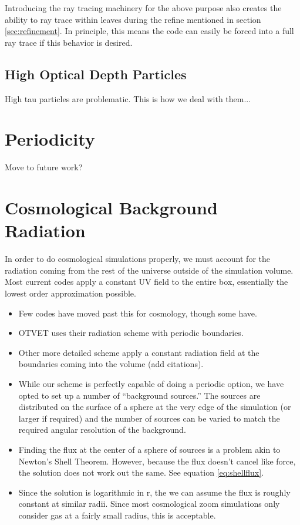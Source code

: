 Introducing the ray tracing machinery for the above purpose also creates the ability to ray trace within leaves during the refine mentioned in section \ref{sec:refinement}. In principle, this means the code can easily be forced into a full ray trace if this behavior is desired.

\subsection{High Optical Depth Particles}
\label{sec:hightau}

High tau particles are problematic. This is how we deal with them...

\section{Periodicity}
\label{sec:periodicity}

Move to future work?

\section{Cosmological Background Radiation}
\label{sec:cosmobackground}

In order to do cosmological simulations properly, we must account for the radiation coming from the rest of the universe outside of the simulation volume. Most current codes apply a constant UV field to the entire box, essentially the lowest order approximation possible.
\begin{itemize}
\item Few codes have moved past this for cosmology, though some have.
\item OTVET \citep{petkovaSpringel09} uses their radiation scheme with periodic boundaries.
\item Other more detailed scheme apply a constant radiation field at the boundaries coming into the volume (add citations).
\item While our scheme is perfectly capable of doing a periodic option, we have opted to set up a number of ``background sources.'' The sources are distributed on the surface of a sphere at the very edge of the simulation (or larger if required) and the number of sources can be varied to match the required angular resolution of the background.
\item Finding the flux at the center of a sphere of sources is a problem akin to Newton's Shell Theorem. However, because the flux doesn't cancel like force, the solution does not work out the same. See equation \ref{eq:shellflux}.
\item Since the solution is logarithmic in r, the we can assume the flux is roughly constant at similar radii. Since most cosmological zoom simulations only consider gas at a fairly small radius, this is acceptable.
\end{itemize}

